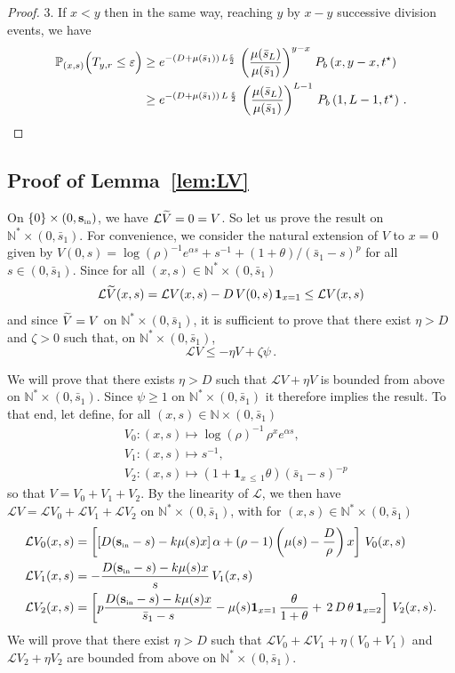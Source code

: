 \documentclass[AHL,Unicode,longabstracts,published]{cedram}
\newcommand{\PP}{\mathbb{P}}
\newcommand{\NN}{\mathbb{N}}
\newcommand{\clL}{\mathcal{L}}
\newcommand{\Sin}{{\mathbf s}_{\textrm{\tiny\rm in}}}
\newcommand{\barmu}{\mu(\bar s_1)}
\newcommand{\1}{\mathbf{1}}
\let\oldtilde\tilde
\renewcommand*{\tilde}[1]{\mathchoice{\widetilde{#1}}{\widetilde{#1}}{\oldtilde{#1}}{\oldtilde{#1}}}
\begin{document}
\begin{proof}
3. If $x<y$ then in the same way, reaching $y$ by $x-y$ successive division events, we have
\begin{align*}
\PP_{(x,s)}
\Big(T_{y,r} \leq \varepsilon\Big) &
\geq e^{-(D+\barmu)\,L\frac{\varepsilon}{2}}\, \left(\frac{\mu(\bar s_L)}{\barmu}\right)^{y-x}
\,P_b\left(x,y-x, t^\star\right)
\\
&
\geq e^{-(D+\barmu)\,L\,\frac{\varepsilon}{2}}\, \left(\frac{\mu(\bar s_L)}{\barmu}\right)^{L-1}
\,P_b\left(1,L-1, t^\star\right)\,.\qedhere
\end{align*}
\end{proof}



\subsection{Proof of Lemma~\ref{lem:LV}}\label{sec:proof.lem.LV}


On $\{0\}\times (0,\Sin)$, we have $\clL\tilde V=0=V$. So let us prove the result on $\NN^* \times (0,\bar s_1)$. For convenience, we consider the natural extension of $V$ to $x=0$ given by $V(0,s)= \log(\rho)^{-1} e^{\alpha s} + s^{-1} + (1+\theta)/(\bar s_1-s)^{p}$ for all $s\in (0,\bar s_1)$. Since for all $(x,s)\in \NN^* \times (0,\bar s_1)$
\[
\clL\tilde V(x,s) = \clL V(x,s) - D\,V(0,s)\,\1_{x=1}\leq \clL V(x,s)
\]
and since $\tilde V=V$ on $\NN^* \times (0,\bar s_1)$, it is sufficient to prove that there exist $\eta>D$ and $\zeta>0$ such that, on $\NN^* \times (0,\bar s_1)$,
\[
\clL V \leq -\eta V + \zeta \psi\,.
\]

We will prove that there exists $\eta>D$ such that $\clL V + \eta V$ is bounded from above on $\NN^* \times (0,\bar s_1)$. Since $\psi \geq 1$ on $\NN^* \times (0,\bar s_1)$ it therefore implies the result. To that end, let define, for all $(x,s)\in \NN \times (0,\bar s_1)$
\begin{align*}
&V_0:(x,s)\mapsto \log(\rho)^{-1}\,\rho^x e^{\alpha s},
\\
&V_1:(x,s)\mapsto s^{-1},
\\ &V_2:(x,s)\mapsto \left(1+\1_{x\,\leq\,1}\theta\right) \left(\bar{s}_1-s\right)^{-p}
\end{align*}
so that $V=V_0+V_1+V_2$. By the linearity of $\clL$, we then have $\clL V=\clL V_0+\clL V_1+\clL V_2$ on $\NN^* \times (0,\bar s_1)$, with for $(x,s)\in \NN^* \times (0,\bar s_1)$
\begin{align*}
\clL V_0(x,s) &=\left[\left[D(\Sin - s)- k \mu(s) x\right] \alpha + (\rho-1)\left(\mu(s)-\frac{D}{\rho}\right) x\right]\,V_0(x,s) \\
\clL V_1(x,s) & = -\frac{D(\Sin - s)- k \mu(s) x }{s}\,V_1(x,s)\\
\clL V_2(x,s) &=\left[p \frac{D(\Sin - s)- k \mu(s)x }{\bar{s}_1-s} -\mu(s)\1_{x= 1}\,\frac{\theta}{1+\theta}+\,2\,D\,\theta\,\1_{x= 2}\right]\,V_2(x,s).
\end{align*}
We will prove that there exist $\eta>D$ such that $\clL V_0 + \clL V_1+ \eta (V_0+V_1)$ and $\clL V_2 + \eta V_2$ are bounded from above on $\NN^* \times (0,\bar s_1)$.
\end{document}
